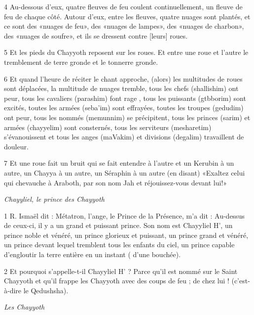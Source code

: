 \par 4 Au-dessous d'eux, quatre fleuves de feu coulent continuellement, un fleuve de feu de chaque côté. Autour d'eux, entre les fleuves, quatre nuages sont plantés, et ce sont des «nuages de feu», des «nuages de lampes», des «nuages de charbon», des «nuages de soufre», et ils se dressent contre [leurs] roues.

\par 5 Et les pieds du Chayyoth reposent sur les roues. Et entre une roue et l’autre le tremblement de terre gronde et le tonnerre gronde.

\par 6 Et quand l'heure de réciter le chant approche, (alors) les multitudes de roues sont déplacées, la multitude de nuages ​​tremble, tous les chefs (shallishim) ont peur, tous les cavaliers (parashim) font rage , tous les puissants (gtbborim) sont excités, toutes les armées (seba'im) sont effrayées, toutes les troupes (gedudim) ont peur, tous les nommés (memunnim) se précipitent, tous les princes (sarim) et armées (chayyelim) sont consternés, tous les serviteurs (mesharetim) s'évanouissent et tous les anges (maVakim) et divisions (degalim) travaillent de douleur.

\par 7 Et une roue fait un bruit qui se fait entendre à l'autre et un Kerubin à un autre, un Chayya à un autre, un Séraphin à un autre (en disant) «Exaltez celui qui chevauche à Araboth, par son nom Jah et réjouissez-vous devant lui!»


\par \textit{Chayyliel, le prince des Chayyoth}

\par 1 R. Ismaël dit : Métatron, l'ange, le Prince de la Présence, m'a dit : Au-dessus de ceux-ci, il y a un grand et puissant prince. Son nom est Chayyliel H', un prince noble et vénéré, un prince glorieux et puissant, un prince grand et vénéré, un prince devant lequel tremblent tous les enfants du ciel, un prince capable d'engloutir la terre entière en un instant ( d'une bouchée).

\par 2 Et pourquoi s'appelle-t-il Chayyliel H' ? Parce qu'il est nommé sur le Saint Chayyoth et qu'il frappe les Chayyoth avec des coups de feu ; de chez lui ! (c'est-à-dire le Qedushsha).


\par \textit{Les Chayyoth}

